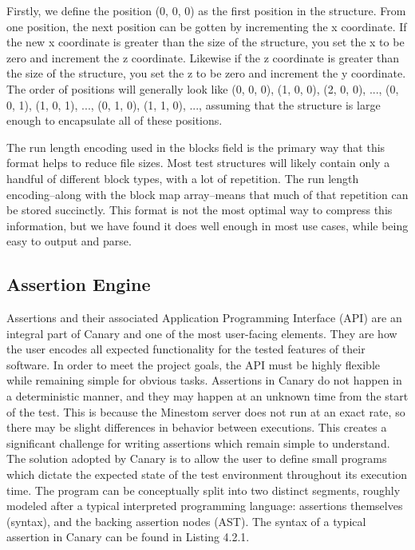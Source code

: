 \documentclass{article}
\begin{document}
\begin{onehalfspacing}
Firstly, we define the position (0, 0, 0) as the first position in the
structure. From one position, the next position can be gotten by
incrementing the x coordinate. If the new x coordinate is greater than
the size of the structure, you set the x to be zero and increment the z
coordinate. Likewise if the z coordinate is greater than the size of the
structure, you set the z to be zero and increment the y coordinate. The
order of positions will generally look like (0, 0, 0), (1, 0, 0), (2, 0,
0), ..., (0, 0, 1), (1, 0, 1), ..., (0, 1, 0), (1, 1, 0), ..., assuming
that the structure is large enough to encapsulate all of these
positions.

The run length encoding used in the blocks field is the primary way that
this format helps to reduce file sizes. Most test structures will likely
contain only a handful of different block types, with a lot of
repetition. The run length encoding--along with the block map
array--means that much of that repetition can be stored succinctly. This
format is not the most optimal way to compress this information, but we
have found it does well enough in most use cases, while being easy to
output and parse.

\subsection{Assertion Engine}

Assertions and their associated Application Programming Interface (API)
are an integral part of Canary and one of the most user-facing elements.
They are how the user encodes all expected functionality for the tested
features of their software. In order to meet the project goals, the API
must be highly flexible while remaining simple for obvious tasks.
Assertions in Canary do not happen in a deterministic manner, and they
may happen at an unknown time from the start of the test. This is
because the Minestom server does not run at an exact rate, so there may
be slight differences in behavior between executions. This creates a
significant challenge for writing assertions which remain simple to
understand. The solution adopted by Canary is to allow the user to
define small programs which dictate the expected state of the test
environment throughout its execution time. The program can be
conceptually split into two distinct segments, roughly modeled after a
typical interpreted programming language: assertions themselves
(syntax), and the backing assertion nodes (AST). The syntax of a typical
assertion in Canary can be found in Listing 4.2.1.


\end{onehalfspacing}
\end{document}

